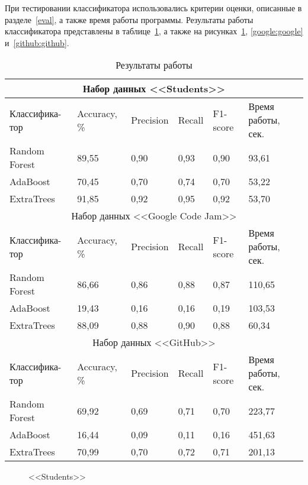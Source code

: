 При тестировании классификатора использовались критерии оценки, описанные в разделе~\ref{eval}, 
а также время работы программы. Результаты работы классификатора представлены в таблице~\ref{tab:results}, а также
на рисунках~\ref{students_res:students_res}, \ref{google:google} и~\ref{github:github}.

\begin{table}[h!]
\caption{ Результаты работы }
\label{tab:results}
\begin{center}
\begin{tabularx}{\linewidth}{|X|X|X|X|X|X|}
\hline
\multicolumn{6}{|c|}{Набор данных <<Students>>} \\
\hline
Классифика- тор & Accuracy, \% & Precision & Recall & F1-score & Время работы, сек.\\
\hline
Random Forest & 89,55 & 0,90 & 0,93 & 0,90 & 93,61\\
\hline
AdaBoost & 70,45 & 0,70 & 0,74 & 0,70 & 53,22\\
\hline
ExtraTrees & 91,85 & 0,92 & 0,95 & 0,92 & 53,70 \\
\hline
\multicolumn{6}{|c|}{Набор данных <<Google Code Jam>>} \\
\hline
Классифика- тор & Accuracy, \% & Precision & Recall & F1-score & Время работы, сек.\\
\hline
Random Forest & 86,66 & 0,86 & 0,88 & 0,87 & 110,65\\
\hline
AdaBoost & 19,43 & 0,16 & 0,16 & 0,19 & 103,53\\
\hline
ExtraTrees & 88,09 & 0,88 & 0,90 & 0,88 & 60,34 \\
\hline
\multicolumn{6}{|c|}{Набор данных <<GitHub>>} \\
\hline
Классифика- тор & Accuracy, \% & Precision & Recall & F1-score & Время работы, сек.\\
\hline
Random Forest & 69,92 & 0,69 & 0,71 & 0,70 & 223,77\\
\hline
AdaBoost & 16,44 & 0,09 & 0,11 & 0,16 & 451,63\\
\hline
ExtraTrees & 70,99 & 0,70 & 0,72 & 0,71 & 201,13 \\
\hline
\end{tabularx}
\end{center}
\end{table}

\begin{figure}[h!]
\caption{ <<Students>> }
\label{students_res:students_res}
\end{figure}

